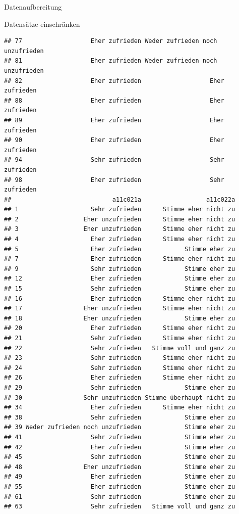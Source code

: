 \documentclass[ignorenonframetext,]{beamer}
\begin{document}
\begin{frame}[fragile]{Datenaufbereitung}
\begin{block}{Datensätze einschränken}
\begin{verbatim}
## 77                   Eher zufrieden Weder zufrieden noch unzufrieden
## 81                   Eher zufrieden Weder zufrieden noch unzufrieden
## 82                   Eher zufrieden                   Eher zufrieden
## 88                   Eher zufrieden                   Eher zufrieden
## 89                   Eher zufrieden                   Eher zufrieden
## 90                   Eher zufrieden                   Eher zufrieden
## 94                   Sehr zufrieden                   Sehr zufrieden
## 98                   Eher zufrieden                   Sehr zufrieden
##                            a11c021a                  a11c022a
## 1                    Sehr zufrieden      Stimme eher nicht zu
## 2                  Eher unzufrieden      Stimme eher nicht zu
## 3                  Eher unzufrieden      Stimme eher nicht zu
## 4                    Eher zufrieden      Stimme eher nicht zu
## 5                    Eher zufrieden            Stimme eher zu
## 7                    Eher zufrieden      Stimme eher nicht zu
## 9                    Sehr zufrieden            Stimme eher zu
## 12                   Eher zufrieden            Stimme eher zu
## 15                   Sehr zufrieden            Stimme eher zu
## 16                   Eher zufrieden      Stimme eher nicht zu
## 17                 Eher unzufrieden      Stimme eher nicht zu
## 18                 Eher unzufrieden            Stimme eher zu
## 20                   Eher zufrieden      Stimme eher nicht zu
## 21                   Sehr zufrieden      Stimme eher nicht zu
## 22                   Sehr zufrieden   Stimme voll und ganz zu
## 23                   Sehr zufrieden      Stimme eher nicht zu
## 24                   Sehr zufrieden      Stimme eher nicht zu
## 26                   Eher zufrieden      Stimme eher nicht zu
## 29                   Sehr zufrieden            Stimme eher zu
## 30                 Sehr unzufrieden Stimme überhaupt nicht zu
## 34                   Eher zufrieden      Stimme eher nicht zu
## 38                   Sehr zufrieden            Stimme eher zu
## 39 Weder zufrieden noch unzufrieden            Stimme eher zu
## 41                   Sehr zufrieden            Stimme eher zu
## 42                   Eher zufrieden            Stimme eher zu
## 45                   Sehr zufrieden            Stimme eher zu
## 48                 Eher unzufrieden            Stimme eher zu
## 49                   Eher zufrieden            Stimme eher zu
## 55                   Eher zufrieden            Stimme eher zu
## 61                   Sehr zufrieden            Stimme eher zu
## 63                   Sehr zufrieden   Stimme voll und ganz zu

\end{verbatim}
\end{block}
\end{frame}
\end{document}
